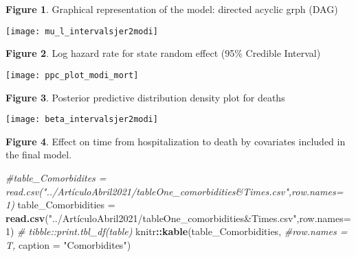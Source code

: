 \documentclass[10pt,letterpaper]{article}
\newenvironment{Shaded}{\begin{snugshade}}{\end{snugshade}}
\newcommand{\CommentTok}[1]{\textcolor[rgb]{0.56,0.35,0.01}{\textit{#1}}}
\newcommand{\DataTypeTok}[1]{\textcolor[rgb]{0.13,0.29,0.53}{#1}}
\newcommand{\DecValTok}[1]{\textcolor[rgb]{0.00,0.00,0.81}{#1}}
\newcommand{\KeywordTok}[1]{\textcolor[rgb]{0.13,0.29,0.53}{\textbf{#1}}}
\newcommand{\NormalTok}[1]{#1}
\newcommand{\OperatorTok}[1]{\textcolor[rgb]{0.81,0.36,0.00}{\textbf{#1}}}
\newcommand{\StringTok}[1]{\textcolor[rgb]{0.31,0.60,0.02}{#1}}
\begin{document}
\textbf{Figure 1}. Graphical representation of the model: directed
acyclic grph (DAG)

\begin{center}\texttt{[image: mu\_l\_intervalsjer2modi]} \end{center}

\textbf{Figure 2}. Log hazard rate for state random effect (95\%
Credible Interval)

\begin{center}\texttt{[image: ppc\_plot\_modi\_mort]} \end{center}

\textbf{Figure 3}. Posterior predictive distribution density plot for
deaths

\begin{center}\texttt{[image: beta\_intervalsjer2modi]} \end{center}

\textbf{Figure 4}. Effect on time from hospitalization to death by
covariates included in the final model.

\begin{Shaded}
\begin{Highlighting}[]
\CommentTok{#table_Comorbidites = read.csv("../ArtículoAbril2021/tableOne_comorbidities&Times.csv",row.names= 1)}
\NormalTok{table_Comorbidities =}\StringTok{ }\KeywordTok{read.csv}\NormalTok{(}\StringTok{"../ArtículoAbril2021/tableOne_comorbidities&Times.csv"}\NormalTok{,}\DataTypeTok{row.names=} \DecValTok{1}\NormalTok{)}
\CommentTok{# tibble::print.tbl_df(table)}
\NormalTok{knitr}\OperatorTok{::}\KeywordTok{kable}\NormalTok{(table_Comorbidities,}
             \CommentTok{#row.names = T, }
             \DataTypeTok{caption =} \StringTok{"Comorbidites"}\NormalTok{)}
\end{Highlighting}
\end{Shaded}
\end{document}
